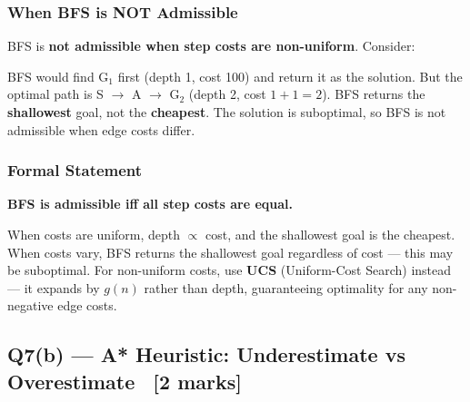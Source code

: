 \documentclass[12pt, a4paper]{article}
\newenvironment{answerbox}{\begin{mdframed}[style=answerframe]}{\end{mdframed}}
\newcommand{\node}[1]{\textbf{#1}}
\begin{document}
\subsubsection*{When BFS is NOT Admissible}

BFS is \textbf{not admissible when step costs are non-uniform}. Consider:

\begin{center}
\end{center}

\noindent BFS would find G$_1$ first (depth 1, cost 100) and return it as the solution. But the optimal path is S $\to$ A $\to$ G$_2$ (depth 2, cost $1+1=2$). BFS returns the \textbf{shallowest} goal, not the \textbf{cheapest}. The solution is suboptimal, so BFS is not admissible when edge costs differ.

\subsubsection*{Formal Statement}

\begin{answerbox}
\textbf{BFS is admissible iff all step costs are equal.}

When costs are uniform, depth $\propto$ cost, and the shallowest goal is the cheapest.
When costs vary, BFS returns the shallowest goal regardless of cost — this may be suboptimal.
For non-uniform costs, use \textbf{UCS} (Uniform-Cost Search) instead — it expands by $g(n)$ rather than depth, guaranteeing optimality for any non-negative edge costs.
\end{answerbox}

\subsection{Q7(b) — A* Heuristic: Underestimate vs Overestimate \ [2 marks]}
\end{document}
